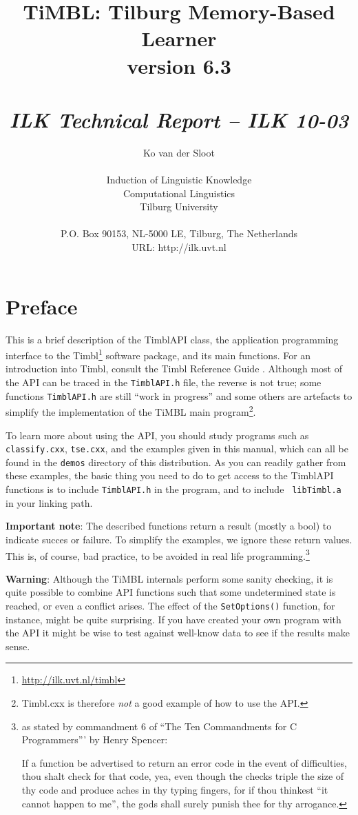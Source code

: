 \documentclass{report}
\author{Ko van der Sloot\\ \ \\ Induction of Linguistic Knowledge\\
        Computational Linguistics\\ Tilburg University \\ \ \\
        P.O. Box 90153, NL-5000 LE, Tilburg, The Netherlands \\ URL:
        http://ilk.uvt.nl}
\title{{\huge TiMBL: Tilburg Memory-Based Learner} \\ \vspace*{0.5cm}
{\bf version 6.3} \\ \vspace*{0.5cm}{\huge API Reference Guide}\\
\vspace*{1cm} {\it ILK Technical Report -- ILK 10-03}}
\begin{document}
\maketitle

\tableofcontents

\chapter*{Preface}

This is a brief description of the TimblAPI class, the application
programming interface to the Timbl\footnote{\url{http://ilk.uvt.nl/timbl}} software package, and its main
functions. For an introduction into Timbl, consult the Timbl Reference
Guide \cite{Daelemans+10}. Although most of the API can be
traced in the {\tt TimblAPI.h} file, the reverse is not true; some
functions {\tt TimblAPI.h} are still ``work in progress'' and some others
are artefacts to simplify the implementation of the TiMBL main
program\footnote{Timbl.cxx is therefore {\em not} a good example of
  how to use the API.}.

To learn more about using the API, you should study programs such as
{\tt classify.cxx}, {\tt tse.cxx}, and the examples given in this
manual, which can all be found in the {\tt demos} directory of this
distribution. As you can readily gather from these examples, the basic
thing you need to do to get access to the TimblAPI functions is to
include {\tt TimblAPI.h} in the program, and to include {\tt
  libTimbl.a} in your linking path.

{\bf Important note}: The described functions return a result (mostly
a bool) to indicate succes or failure. To simplify the examples, we
ignore these return values. This is, of course, bad practice, to be avoided in
real life programming.\footnote{as stated by commandment 6 of ``The
  Ten Commandments for C Programmers''' by Henry Spencer:	

If a function be advertised to return an error code in the event of
difficulties, thou shalt check for that code, yea, even though the
checks triple the size of thy code and produce aches in thy typing
fingers, for if thou thinkest ``it cannot happen to me'', the gods
shall surely punish thee for thy arrogance.}

{\bf Warning}: Although the TiMBL internals perform some sanity
checking, it is quite possible to combine API functions such
that some undetermined state is reached, or even a conflict
arises. The effect of the {\tt SetOptions()} function, for instance,
might be quite surprising. If you have created your own program
with the API it might be wise to test against well-know data to see if
the results make sense.
\end{document}
